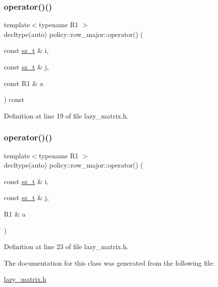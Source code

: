\subsubsection{\texorpdfstring{operator()()}{operator()()}\hspace{0.1cm}{\footnotesize\ttfamily [1/2]}}
{\footnotesize\ttfamily template$<$typename R1 $>$ \\
decltype(auto) policy\+::row\+\_\+major\+::operator() (\begin{DoxyParamCaption}\item[{const \mbox{\hyperlink{lazy__matrix_8h_acba2745dcfc55b2d05ff45adc6a0a015}{sz\+\_\+t}} \&}]{i,  }\item[{const \mbox{\hyperlink{lazy__matrix_8h_acba2745dcfc55b2d05ff45adc6a0a015}{sz\+\_\+t}} \&}]{j,  }\item[{const R1 \&}]{a }\end{DoxyParamCaption}) const\hspace{0.3cm}{\ttfamily [inline]}}



Definition at line 19 of file lazy\+\_\+matrix.\+h.

\mbox{\label{classpolicy_1_1row__major_afb0a6d8d4e6d8ae7ae47e5cfe6ae90d2}} 
\subsubsection{\texorpdfstring{operator()()}{operator()()}\hspace{0.1cm}{\footnotesize\ttfamily [2/2]}}
{\footnotesize\ttfamily template$<$typename R1 $>$ \\
decltype(auto) policy\+::row\+\_\+major\+::operator() (\begin{DoxyParamCaption}\item[{const \mbox{\hyperlink{lazy__matrix_8h_acba2745dcfc55b2d05ff45adc6a0a015}{sz\+\_\+t}} \&}]{i,  }\item[{const \mbox{\hyperlink{lazy__matrix_8h_acba2745dcfc55b2d05ff45adc6a0a015}{sz\+\_\+t}} \&}]{j,  }\item[{R1 \&}]{a }\end{DoxyParamCaption})\hspace{0.3cm}{\ttfamily [inline]}}



Definition at line 23 of file lazy\+\_\+matrix.\+h.



The documentation for this class was generated from the following file\+:\begin{DoxyCompactItemize}
\item 
\mbox{\hyperlink{lazy__matrix_8h}{lazy\+\_\+matrix.\+h}}\end{DoxyCompactItemize}
